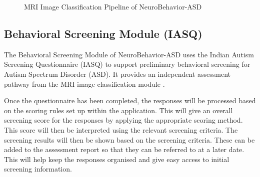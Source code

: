 \documentclass[conference]{IEEEtran}
\begin{document}
\begin{figure}[!t]
\centering
{}
\caption{MRI Image Classification Pipeline of NeuroBehavior-ASD}
\label{fig:mri_pipeline}
\end{figure}

\subsection{Behavioral Screening Module (IASQ)}
The Behavioral Screening Module of NeuroBehavior-ASD uses the Indian Autism Screening Questionnaire (IASQ) to support preliminary behavioral screening for Autism Spectrum Disorder (ASD). It provides an independent assessment pathway from the MRI image classification module \cite{rajkumar2025}.

Once the questionnaire has been completed, the responses will be processed based on the scoring rules set up within the application. This will give an overall screening score for the responses by applying the appropriate scoring method. This score will then be interpreted using the relevant screening criteria. The screening results will then be shown based on the screening criteria. These can be added to the assessment report so that they can be referred to at a later date. This will help keep the responses organised and give easy access to initial screening information.
\end{document}
